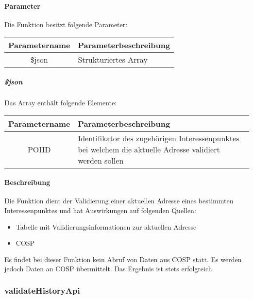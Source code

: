 \paragraph{Parameter} Die Funktion besitzt folgende Parameter:
\begin{table}[H]
	\begin{tabular}{|c|p{11cm}|}
		\hline
		\textbf{Parametername} & \textbf{Parameterbeschreibung} \\ \hline
		\$json & Strukturiertes Array \\ \hline
	\end{tabular}
\end{table}
\subparagraph{\$json}Das Array enthält folgende Elemente:
\begin{table}[H]
	\begin{tabular}{|c|p{11cm}|}
		\hline
		\textbf{Parametername} & \textbf{Parameterbeschreibung} \\ \hline
		POIID & Identifikator des zugehörigen Interessenpunktes bei welchem die aktuelle Adresse validiert werden sollen \\ \hline
	\end{tabular}
\end{table}
\paragraph{Beschreibung} Die Funktion dient der Validierung einer aktuellen Adresse eines bestimmten Interessenpunktes und hat Auswirkungen auf folgenden Quellen:
\begin{itemize}
	\item Tabelle mit Validierungsinformationen zur aktuellen Adresse
	\item COSP
\end{itemize}
Es findet bei dieser Funktion kein Abruf von Daten aus {\glqq COSP\grqq} statt. Es werden jedoch Daten an {\glqq COSP\grqq} übermittelt. Das Ergebnis ist stets erfolgreich.
\subsubsection{validateHistoryApi}
